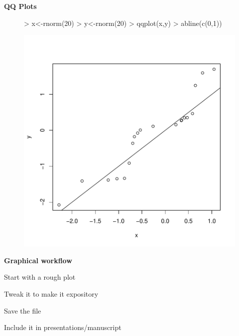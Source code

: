 \documentclass[xcolor=dvipsnames , 11pt]{beamer}
\begin{document}
\begin{frame}[fragile]{\textbf{QQ Plots}}

\begin{center}
\begin{figure}
\centering
\begin{Schunk}
\begin{Sinput}
> x<-rnorm(20)
> y<-rnorm(20)
> qqplot(x,y)
> abline(c(0,1))
\end{Sinput}
\end{Schunk}
\includegraphics{day1_graphs_presentation-008}
\end{figure}
\end{center}

\end{frame}

\begin{frame}{\textbf{Graphical workflow}}

\begin{itemize}
\begin{pause}
\item{Start with a rough plot}
\end{pause}
\begin{pause}
\item{Tweak it to make it expository}
\end{pause}
\begin{pause}
\item{Save the file}
\end{pause}
\begin{pause}
\item{Include it in presentations/manuscript}
\end{pause}
\end{itemize}
\end{frame}
\end{document}
